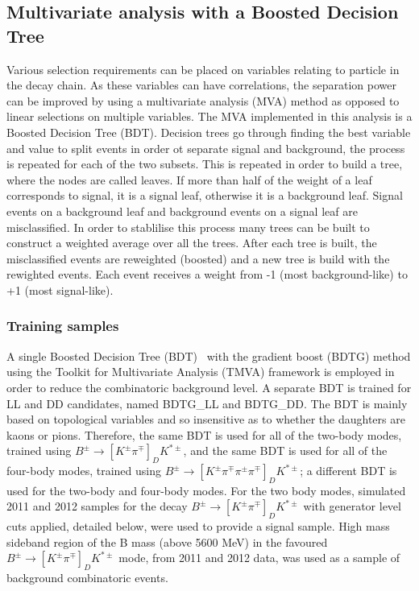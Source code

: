 \subsection{Multivariate analysis with a Boosted Decision Tree}
\label{sec:selection:bdt}

Various selection requirements can be placed on variables relating to particle in the decay chain. As these variables can have correlations, the separation power can be improved by using a multivariate analysis (MVA) method as opposed to linear selections on multiple variables. The MVA implemented in this analysis is a Boosted Decision Tree (BDT). Decision trees go through finding the best variable and value to split events in order ot separate signal and background, the process is repeated for each of the two subsets. This is repeated in order to build a tree, where the nodes are called leaves. If more than half of the weight of a leaf corresponds to signal, it is a signal leaf, otherwise it is a background leaf. Signal events on a background leaf and background events on a signal leaf are misclassified. In order to stablilise this process many trees can be built to construct a weighted average over all the trees. After each tree is built, the misclassified events are reweighted (boosted) and a new tree is build with the rewighted events. Each event receives a weight from -1 (most background-like) to +1 (most signal-like). 

\subsubsection{Training samples}

A single Boosted Decision Tree (BDT)~\cite{Breiman} with the gradient boost (BDTG) method using the Toolkit for Multivariate Analysis (TMVA) framework is employed in order to reduce the combinatoric background level. A separate BDT is trained for LL and DD candidates, named BDTG\_LL and BDTG\_DD. The BDT is mainly based on topological variables and so insensitive as to whether the \D daughters are kaons or pions. Therefore, the same BDT is used for all of the two-body modes, trained using $B^{\pm} \to [K^{\pm}\pi^{\mp}]_D K^{*\pm}$, and the same BDT is used for all of the four-body modes, trained using $B^{\pm} \to [K^{\pm}\pi^{\mp}\pi^{\pm}\pi^{\mp}]_D K^{*\pm}$; a different BDT is used for the two-body and four-body modes. For the two body modes, simulated 2011 and 2012 samples for the decay $B^{\pm} \to [K^{\pm}\pi^{\mp}]_D K^{*\pm}$ with generator level cuts applied, detailed below, were used to provide a signal sample. High mass sideband region of the B mass (above 5600 MeV) in the favoured $B^{\pm} \to [K^{\pm}\pi^{\mp}]_D K^{*\pm}$ mode, from 2011 and 2012 data, was used as a sample of background combinatoric events. 

